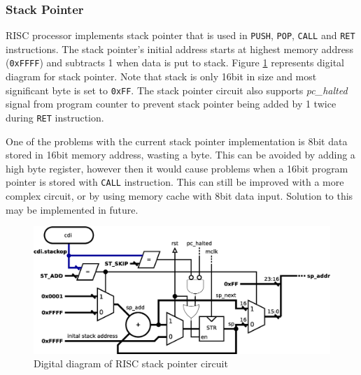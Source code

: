 \documentclass[a4paper,12pt]{article}
\begin{document}
\begin{multicols}{2}
	
\subsubsection{Stack Pointer} \label{sec:sp}
RISC processor implements stack pointer that is used in \texttt{PUSH}, \texttt{POP}, \texttt{CALL} and \texttt{RET} instructions. The stack pointer's initial address starts at highest memory address (\texttt{0xFFFF}) and subtracts 1 when data is put to stack. Figure \ref{fig:stack_pointer} represents digital diagram for stack pointer. Note that stack is only 16bit in size and most significant byte is set to \texttt{0xFF}. The stack pointer circuit also supports \textit{pc\_halted} signal from program counter to prevent stack pointer being added by 1 twice during \texttt{RET} instruction. 

One of the problems with the current stack pointer implementation is 8bit data stored in 16bit memory address, wasting a byte. This can be avoided by adding a high byte register, however then it would cause problems when a 16bit program pointer is stored with \texttt{CALL} instruction. This can still be improved with a more complex circuit, or by using memory cache with 8bit data input. Solution to this may be implemented in future.

\end{multicols}

\begin{figure}[h!]
	\centering
	\includegraphics[scale=0.4]{graphics/stack_diagram.eps}
	\caption{Digital diagram of RISC stack pointer circuit}
	\label{fig:stack_pointer}
\end{figure}
\end{document}
